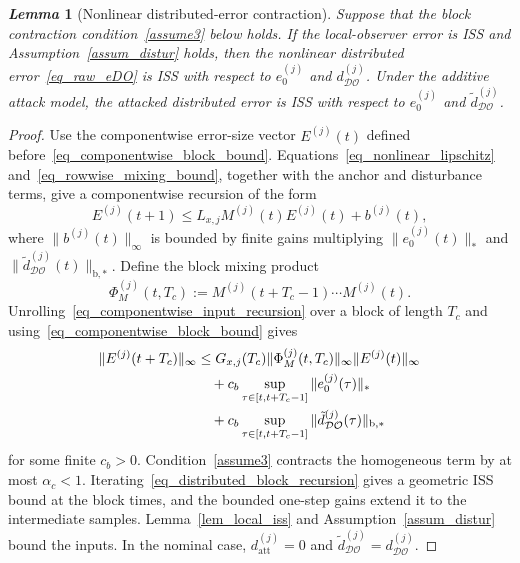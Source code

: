 \documentclass[letterpaper,journal]{IEEEtran}
\def\DO{\mathcal{DO}} %
\newtheorem{lemma}{\it Lemma}%
\begin{document}
\begin{lemma}[Nonlinear distributed-error contraction]\label{lem_dist_contraction}
Suppose that the block contraction condition~\eqref{assume3} below holds. If the local-observer error is ISS and Assumption~\ref{assum_distur} holds, then the nonlinear distributed error~\eqref{eq_raw_eDO} is ISS with respect to $e_0^{(j)}$ and $d_{\DO}^{(j)}$. Under the additive attack model, the attacked distributed error is ISS with respect to $e_0^{(j)}$ and $\tilde d_{\DO}^{(j)}$.
\end{lemma}
\begin{proof}
Use the componentwise error-size vector $E^{(j)}(t)$ defined before~\eqref{eq_componentwise_block_bound}. Equations~\eqref{eq_nonlinear_lipschitz} and~\eqref{eq_rowwise_mixing_bound}, together with the anchor and disturbance terms, give a componentwise recursion of the form
\begin{equation}
E^{(j)}(t+1)
\le L_{x,j}M^{(j)}(t)E^{(j)}(t)+b^{(j)}(t),
\label{eq_componentwise_input_recursion}
\end{equation}
where $\|b^{(j)}(t)\|_\infty$ is bounded by finite gains multiplying $\|e_0^{(j)}(t)\|_*$ and $\|\tilde d_{\DO}^{(j)}(t)\|_{\mathrm{b},*}$. Define the block mixing product
\begin{equation}
\Phi_M^{(j)}(t,T_c)
:=M^{(j)}(t+T_c-1)\cdots M^{(j)}(t).
\label{eq_block_mixing_product}
\end{equation}
Unrolling~\eqref{eq_componentwise_input_recursion} over a block of length $T_c$ and using~\eqref{eq_componentwise_block_bound} gives
\begin{align}
\|E^{(j)}(t+T_c)\|_\infty
&\le G_{x,j}(T_c)
\|\Phi_M^{(j)}(t,T_c)\|_\infty
\|E^{(j)}(t)\|_\infty\notag\\
&\quad+c_b\sup_{\tau\in[t,t+T_c-1]}
\|e_0^{(j)}(\tau)\|_*\notag\\
&\quad+c_b\sup_{\tau\in[t,t+T_c-1]}
\|\tilde d_{\DO}^{(j)}(\tau)\|_{\mathrm{b},*}
\label{eq_distributed_block_recursion}
\end{align}
for some finite $c_b>0$. Condition~\eqref{assume3} contracts the homogeneous term by at most $\alpha_c<1$. Iterating~\eqref{eq_distributed_block_recursion} gives a geometric ISS bound at the block times, and the bounded one-step gains extend it to the intermediate samples. Lemma~\ref{lem_local_iss} and Assumption~\ref{assum_distur} bound the inputs. In the nominal case, $d_{\mathrm{att}}^{(j)}=0$ and $\tilde d_{\DO}^{(j)}=d_{\DO}^{(j)}$.
\end{proof}
\end{document}
